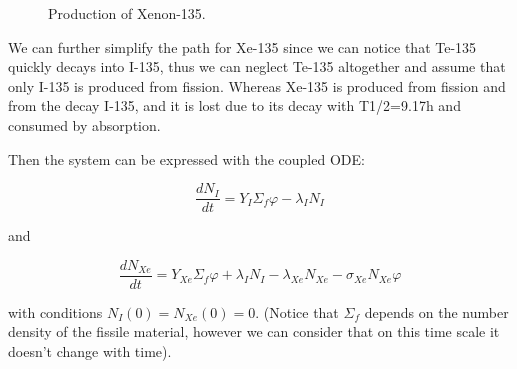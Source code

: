\begin{figure}[ht!]
\protect {}\protect
\caption{\label{fig:xenonprod} \footnotesize{Production of Xenon-135.}}
\end{figure}

We can further simplify the path for Xe-135 since we can notice that Te-135 quickly decays into I-135, thus we can neglect Te-135 altogether and assume that only I-135 is produced from fission. Whereas Xe-135 is produced from fission and from the decay I-135, and it is lost due to its decay with T1/2=9.17h and consumed by absorption. 

Then the system can be expressed with the coupled ODE:


$$ \frac{dN_I}{dt}=Y_I \Sigma_f\varphi-\lambda_I N_I $$

and

$$ \frac{dN_{Xe}}{dt}=Y_{Xe}\Sigma_f\varphi + \lambda_IN_I -\lambda_{Xe}N_{Xe} - \sigma_{Xe}N_{Xe}\varphi  $$

with conditions $N_I(0)=N_{Xe}(0)=0$. (Notice that $\Sigma_f$ depends on the number density of the fissile material, however we can consider that on this time scale it doesn't change with time).

